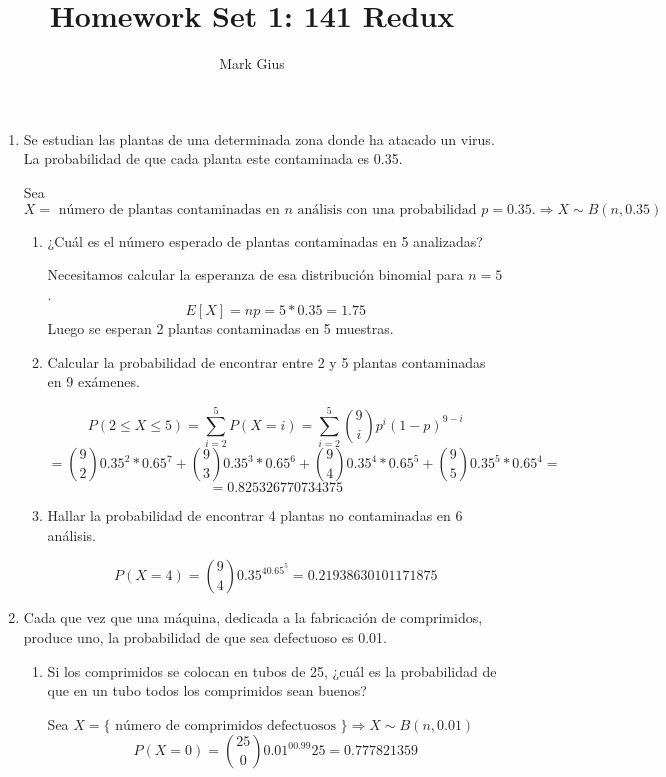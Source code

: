 \documentclass[11pt]{article}
\begin{document}
\author{Mark Gius}
\title{Homework Set 1: 141 Redux}
\maketitle

\begin{enumerate}

\item 

Se estudian las plantas de una determinada zona donde ha atacado un virus. La probabilidad de que cada planta este contaminada es 0.35.

Sea $X= \text{ número de plantas contaminadas en } n \text{ análisis con una probabilidad } p=0.35.  \Longrightarrow X \sim B(n,0.35)$ 

\begin{enumerate}
\item ¿Cuál es el número esperado de plantas contaminadas en 5 analizadas?

Necesitamos calcular la esperanza de esa distribución binomial para $n=5$.
\[
E[X]=np=5*0.35=1.75
\]
Luego se esperan 2 plantas contaminadas en 5 muestras.

\item Calcular la probabilidad de encontrar entre 2 y 5 plantas contaminadas en 9 exámenes.

\[
P(2 \leq X \leq 5) = \sum_{i=2}^5P(X=i) = \sum_{i=2}^5\binom{9}{i}p^i(1-p)^{9-i}
\]
\[
= \binom{9}{2}0.35^2*0.65^7+\binom{9}{3}0.35^3*0.65^6+\binom{9}{4}0.35^4*0.65^5+\binom{9}{5}0.35^5*0.65^4= 
\]
\[
= 0.825326770734375
\]

\item Hallar la probabilidad de encontrar 4 plantas no contaminadas en 6 análisis.

\[
P(X=4)=\binom{9}{4}0.35^40.65^5=0.21938630101171875
\]
\end{enumerate}

\item 

Cada que vez que una máquina, dedicada a la fabricación de comprimidos, produce uno, la probabilidad de que sea defectuoso es 0.01.

\begin{enumerate}
\item Si los comprimidos se colocan en tubos de 25, ¿cuál es la probabilidad de que en un tubo todos los comprimidos sean buenos?

Sea $X = \{\text{ número de comprimidos defectuosos } \} \Longrightarrow X \sim B(n,0.01)$
\[
P(X=0)=\binom{25}{0}0.01^00.99{25} = 0.777821359
\]


\end{enumerate}
\end{enumerate}
\end{document}
